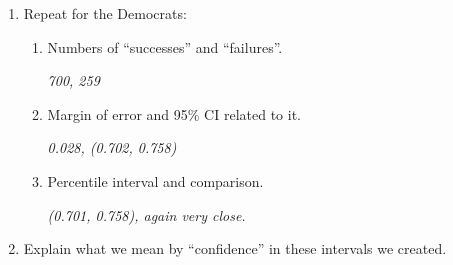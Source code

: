 \begin{enumerate}
\begin{enumerate}
\begin{enumerate}
\begin{key}
  {\em 0.016}
\end{key}
      \item Find the ``margin of error'' for a 95\% Confidence
        interval and create the interval.

\begin{students}
\vspace{.8cm}
\end{students}

\begin{key}
  {\em ME = 0.032, 95\% CI: 0.27$\pm 0.032 = (0.38, 0.302)$}
\end{key}
  \item Are the endpoints close to those we get from the web app?
\begin{students}
\vspace{.8cm}
\end{students}

\begin{key}
  {\em almost identical: ( 0.237 , 0.303 )}
\end{key}
      \end{enumerate}
    \item Repeat for the Democrats:
      \begin{enumerate}
      \item Numbers of ``successes'' and ``failures''.
\begin{students}
\vspace{.8cm}
\end{students}

\begin{key}
  {\em 700, 259 }
\end{key}
      \item Margin of error and 95\% CI related to it.
\begin{students}
\vspace{.8cm}
\end{students}

\begin{key}
  {\em 0.028, (0.702, 0.758)}
\end{key}
      \item Percentile interval and comparison.
\begin{students}
\vspace{.8cm}
\end{students}

\begin{key}
  {\em (0.701, 0.758), again very close. }
\end{key}
      \end{enumerate}
    \item Explain what we mean by ``confidence'' in these intervals we
      created.
\begin{students}
\vspace{3.8cm}
\end{students}


\end{enumerate}
\end{enumerate}
